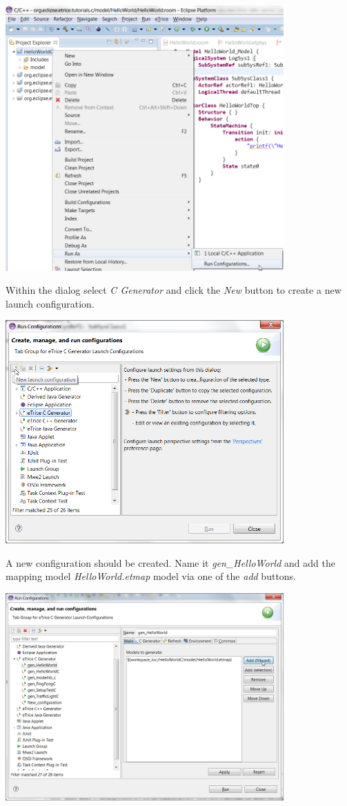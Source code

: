 \includegraphics[width=0.8\textwidth]{images/016-HelloWorldC06.png}

Within the dialog select \textit{\eTrice{} C Generator} and click the \textit{New} button to create a new 
launch configuration.

\includegraphics[width=0.8\textwidth]{images/016-HelloWorldC07.png}

A new configuration should be created. Name it \textit{gen\_HelloWorld} and add the mapping model \emph{HelloWorld.etmap} model via one of the 
\textit{add} buttons.

\includegraphics[width=0.8\textwidth]{images/016-HelloWorldC08.png}

